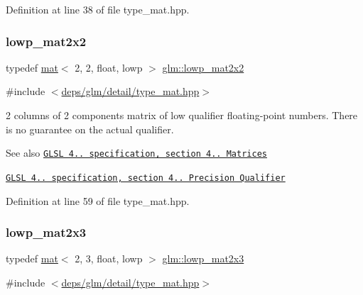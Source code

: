 Definition at line 38 of file type\+\_\+mat.\+hpp.

\mbox{\label{group__core__precision_gaab9064a0fd0e3ac8d4ae8ceb2dc4fe56}} 
\subsubsection{\texorpdfstring{lowp\+\_\+mat2x2}{lowp\_mat2x2}}
{\footnotesize\ttfamily typedef \hyperlink{structglm_1_1mat}{mat}$<$ 2, 2, float, lowp $>$ \hyperlink{group__core__precision_gaab9064a0fd0e3ac8d4ae8ceb2dc4fe56}{glm\+::lowp\+\_\+mat2x2}}



{\ttfamily \#include $<$\hyperlink{type__mat_8hpp}{deps/glm/detail/type\+\_\+mat.\+hpp}$>$}

2 columns of 2 components matrix of low qualifier floating-\/point numbers. There is no guarantee on the actual qualifier.

\begin{DoxySeeAlso}{See also}
\href{http://www.opengl.org/registry/doc/GLSLangSpec.4.20.8.pdf}{\tt G\+L\+SL 4.. specification, section 4.. Matrices} 

\href{http://www.opengl.org/registry/doc/GLSLangSpec.4.20.8.pdf}{\tt G\+L\+SL 4.. specification, section 4.. Precision Qualifier} 
\end{DoxySeeAlso}


Definition at line 59 of file type\+\_\+mat.\+hpp.

\mbox{\label{group__core__precision_gafb73af64c7fb56c398efec50b5cb5108}} 
\subsubsection{\texorpdfstring{lowp\+\_\+mat2x3}{lowp\_mat2x3}}
{\footnotesize\ttfamily typedef \hyperlink{structglm_1_1mat}{mat}$<$ 2, 3, float, lowp $>$ \hyperlink{group__core__precision_gafb73af64c7fb56c398efec50b5cb5108}{glm\+::lowp\+\_\+mat2x3}}



{\ttfamily \#include $<$\hyperlink{type__mat_8hpp}{deps/glm/detail/type\+\_\+mat.\+hpp}$>$}

